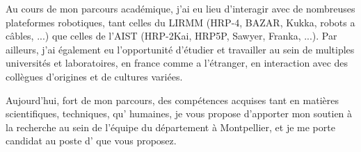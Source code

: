 \documentclass[11pt, a4paper]{awesome-cv}
\begin{document}
\begin{cvletter}
  Au cours de mon parcours académique, j'ai eu lieu d'interagir avec de nombreuses plateformes robotiques, tant celles du LIRMM  (HRP-4, BAZAR, Kukka, robots a câbles, ...) que celles de l'AIST (HRP-2Kai, HRP5P, Sawyer, Franka, ...). Par ailleurs, j'ai également eu l'opportunité d'étudier et travailler au sein de multiples universités et laboratoires, en france comme a l'étranger, en interaction avec des collègues d'origines et de cultures variées.

  Aujourd'hui, fort de mon parcours, des compétences acquises tant en matières scientifiques, techniques, qu' humaines, je vous propose d'apporter mon soutien à la recherche au sein de l’équipe du département  à Montpellier, et je me porte candidat au poste d' que vous proposez.

\end{cvletter}


\makeletterclosing
\end{document}
